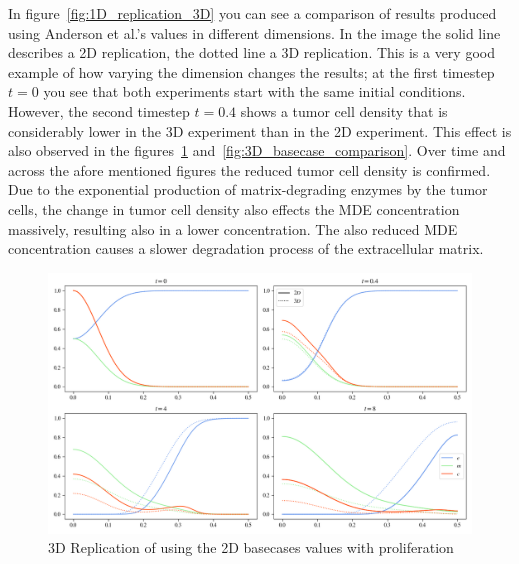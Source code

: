 In figure~\ref{fig:1D_replication_3D} you can see a comparison of results produced using Anderson et al.'s values in different dimensions. In the image the solid line describes a 2D replication, the dotted line a 3D replication. This is a very good example of how varying the dimension changes the results; at the first timestep $t=0$ you see that both experiments start with the same initial conditions. However, the second timestep $t=0.4$ shows a tumor cell density that is considerably lower in the 3D experiment than in the 2D experiment. This effect is also observed in the figures~\ref{fig:2D_proliferation_replication_3D} and~\ref{fig:3D_basecase_comparison}. Over time and across the afore mentioned figures the reduced tumor cell density is confirmed. Due to the exponential production of matrix-degrading enzymes by the tumor cells, the change in tumor cell density also effects the MDE concentration massively, resulting also in a lower concentration. The also reduced MDE concentration causes a slower degradation process of the extracellular matrix.
\begin{figure}[h!]
    \centering
    \includegraphics[width=\textwidth]{resources/images/2D_proliferation_replication_3D.png}
    \caption{3D Replication of using the 2D basecases values with proliferation}
    \label{fig:2D_proliferation_replication_3D}
\end{figure}


